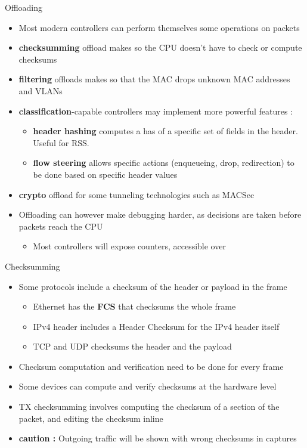 \begin{frame}{Offloading}
	\begin{itemize}
		\item Most modern controllers can perform themselves some operations on packets
		\item \textbf{checksumming} offload makes so the CPU doesn't have to check or compute checksums
		\item \textbf{filtering} offloads makes so that the MAC drops unknown MAC addresses and VLANs
		\item \textbf{classification}-capable controllers may implement more powerful features :
			\begin{itemize}
				\item \textbf{header hashing} computes a has of a specific set of fields in the header. Useful for RSS.
				\item \textbf{flow steering} allows specific actions (enqueueing, drop, redirection) to be done based on specific header values
			\end{itemize}
		\item \textbf{crypto} offload for some tunneling technologies such as MACSec
		\item Offloading can however make debugging harder, as decisions are taken before packets reach the CPU
			\begin{itemize}
				\item Most controllers will expose counters, accessible over 
			\end{itemize}
	\end{itemize}
\end{frame}

\begin{frame}{Checksumming}
	\begin{itemize}
		\item Some protocols include a checksum of the header or payload in the frame
			\begin{itemize}
				\item Ethernet has the \textbf{FCS} that checksums the whole frame
				\item IPv4 header includes a Header Checksum for the IPv4 header itself
				\item TCP and UDP checksums the header and the payload
			\end{itemize}
		\item Checksum computation and verification need to be done for every frame
		\item Some devices can compute and verify checksums at the hardware level
		\item TX checksumming involves computing the checksum of a section of the packet, and editing the checksum inline
		\item \textbf{caution :} Outgoing traffic will be shown with wrong checksums in captures
	\end{itemize}
\end{frame}

